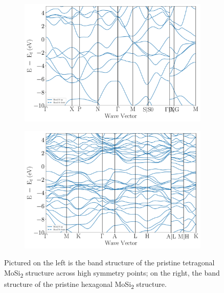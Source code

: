 \documentclass[12pt]{article}
\theoremstyle{plain}
\theoremstyle{definition}
\newcommand{\<}{\langle}
\renewcommand{\>}{\rangle}
\begin{document}
\begin{figure}
\centering
\begin{subfigure}{.5\textwidth}
  \centering
  \includegraphics[width=\linewidth]{bs_MoSi2_tetragonal}
  \caption{}
\label{fig:bs-mosi2-tetra}
\end{subfigure}%
\begin{subfigure}{.5\textwidth}
  \centering
  \includegraphics[width=\linewidth]{bs_MoSi2_hexagonal}
  \caption{}
\label{fig:bs-mosi2-hexa}
\end{subfigure}
\caption{Pictured on the left is the band structure of the pristine tetragonal MoSi\textsubscript{2} structure across high symmetry points; on the right, the band structure of the pristine hexagonal MoSi\textsubscript{2} structure.}
\label{fig:bs_MoSi2}
\end{figure}

\clearpage
\end{document}
